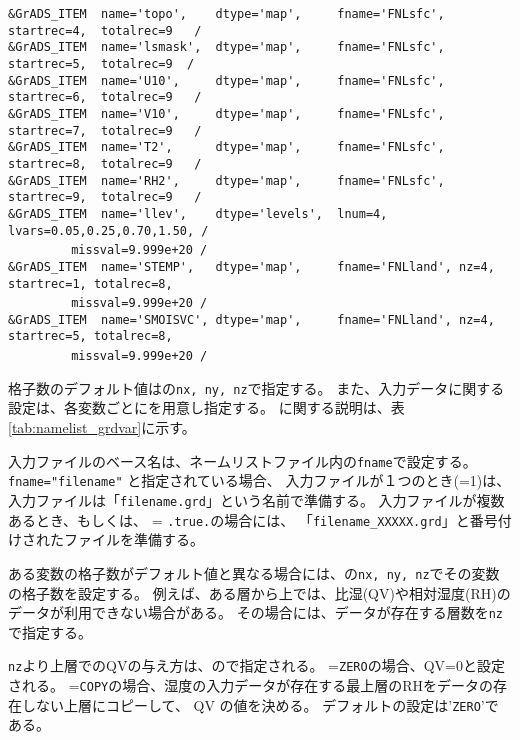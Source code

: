 {\verb|&GrADS_ITEM  name='topo',    dtype='map',     fname='FNLsfc', startrec=4,  totalrec=9   / |  \\
\verb|&GrADS_ITEM  name='lsmask',  dtype='map',     fname='FNLsfc', startrec=5,  totalrec=9  /  |  \\
\verb|&GrADS_ITEM  name='U10',     dtype='map',     fname='FNLsfc', startrec=6,  totalrec=9   / |  \\
\verb|&GrADS_ITEM  name='V10',     dtype='map',     fname='FNLsfc', startrec=7,  totalrec=9   / |  \\
\verb|&GrADS_ITEM  name='T2',      dtype='map',     fname='FNLsfc', startrec=8,  totalrec=9   / |  \\
\verb|&GrADS_ITEM  name='RH2',     dtype='map',     fname='FNLsfc', startrec=9,  totalrec=9   / |  \\
\verb|&GrADS_ITEM  name='llev',    dtype='levels',  lnum=4, lvars=0.05,0.25,0.70,1.50, /        |  \\
~~~~~~~~\verb| missval=9.999e+20 /|  \\
\verb|&GrADS_ITEM  name='STEMP',   dtype='map',     fname='FNLland', nz=4, startrec=1, totalrec=8,|\\
~~~~~~~~\verb| missval=9.999e+20 /|  \\
\verb|&GrADS_ITEM  name='SMOISVC', dtype='map',     fname='FNLland', nz=4, startrec=5, totalrec=8,|\\
~~~~~~~~\verb| missval=9.999e+20 /|  \\
}


格子数のデフォルト値はの\verb|nx, ny, nz|で指定する。
また、入力データに関する設定は、各変数ごとにを用意し指定する。
に関する説明は、表\ref{tab:namelist_grdvar}に示す。

入力ファイルのベース名は、ネームリストファイル内の\verb|fname|で設定する。
\verb|fname="filename"| と指定されている場合、
入力ファイルが１つのとき(=1)は、入力ファイルは「\verb|filename.grd|」という名前で準備する。
入力ファイルが複数あるとき、もしくは、 = \verb|.true.|の場合には、
「\verb|filename_XXXXX.grd|」と番号付けされたファイルを準備する。

ある変数の格子数がデフォルト値と異なる場合には、の\verb|nx, ny, nz|でその変数の格子数を設定する。
例えば、ある層から上では、比湿(QV)や相対湿度(RH)のデータが利用できない場合がある。
その場合には、データが存在する層数を\verb|nz|で指定する。

\verb|nz|より上層でのQVの与え方は、ので指定される。
=\verb|ZERO|の場合、QV=0と設定される。
=\verb|COPY|の場合、湿度の入力データが存在する最上層のRHをデータの存在しない上層にコピーして、
QV の値を決める。
デフォルトの設定は'\verb|ZERO|'である。


